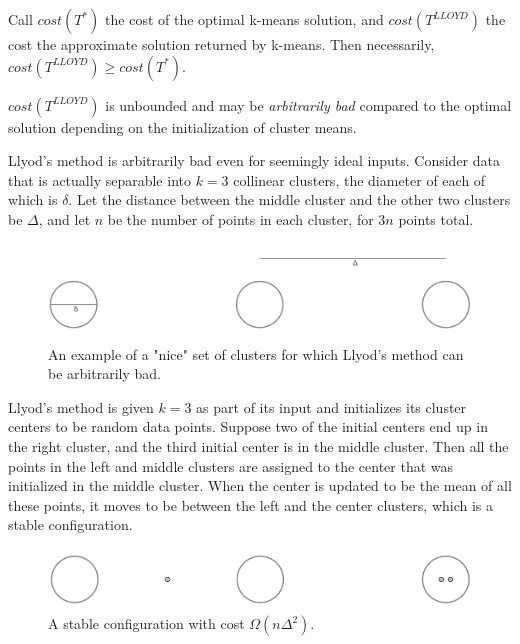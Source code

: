 \begin{remark}
Call $cost(T^*)$ the cost of the optimal k-means solution, and $cost(T^{LLOYD})$ the cost the approximate solution returned by k-means. Then necessarily, $cost(T^{LLOYD}) \geq cost(T^*)$.
\end{remark}

\begin{remark}
$cost(T^{LLOYD})$ is unbounded and may be \emph{arbitrarily bad} compared to the optimal solution depending on the initialization of cluster means.
\end{remark}

\begin{example} 
Llyod's method is arbitrarily bad even for seemingly ideal inputs. Consider data that is actually separable into $k=3$ collinear clusters, the diameter of each of which is $\delta$. Let the distance between the middle cluster and the other two clusters be $\Delta$, and let $n$ be the number of points in each cluster, for $3n$ points total. 

\begin{figure}
	\centering
	\captionsetup{width=0.8\textwidth}
	\includegraphics[scale=0.6]{chapter_1/files/kmeans.png}
	\caption{An example of a "nice" set of clusters for which Llyod's method can be arbitrarily bad.}
	\label{fig:kmeans}
\end{figure}

Llyod's method is given $k=3$ as part of its input and initializes its
cluster centers to be random data points. Suppose two of the initial
centers end up in the right cluster, and the third initial center is
in the middle cluster. Then all the points in the left and middle
clusters are assigned to the center that was initialized in the middle
cluster. When the center is updated to be the mean of all these
points, it moves to be between the left and the center clusters, which
is a stable configuration. 

\begin{figure}
	\centering
	\captionsetup{width=0.8\textwidth}
	\includegraphics[scale=0.6]{chapter_1/files/stable-kmeans.png}
	\caption{A stable configuration with cost $\Omega(n\Delta^2)$.}
	\label{fig:kmeans}
\end{figure}


\end{example}
